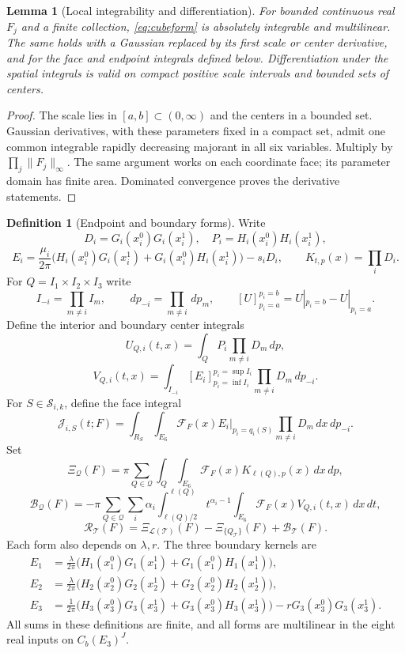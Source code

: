 \documentclass[12pt,reqno]{amsart}
\theoremstyle{plain}
\newtheorem{lemma}[theorem]{Lemma}
\theoremstyle{definition}
\newtheorem{definition}[theorem]{Definition}
\theoremstyle{remark}
\numberwithin{equation}{section}
\newcommand{\T}{\mathcal T}
\newcommand{\dd}{\,d}
\begin{document}
\begin{lemma}[Local integrability and differentiation]\label{lem:local_integrability}
For bounded continuous real $F_j$ and a finite collection,
\eqref{eq:cubeform} is absolutely integrable and multilinear.
The same holds with a Gaussian replaced by its first scale or center
derivative, and for the face and endpoint integrals defined below.
Differentiation under the spatial integrals is valid on compact
positive scale intervals and bounded sets of centers.
\end{lemma}
\begin{proof}
The scale lies in $[a,b]\subset(0,\infty)$ and the centers in a
bounded set. Gaussian derivatives, with these parameters fixed in a
compact set, admit one common integrable rapidly decreasing majorant
in all six variables. Multiply by $\prod_j\|F_j\|_\infty$.
The same argument works on each coordinate face; its parameter domain
has finite area. Dominated convergence proves the derivative statements.
\end{proof}

\begin{definition}[Endpoint and boundary forms]\label{def:boundary}
Write
\[
 D_i=G_i(x_i^0)G_i(x_i^1),\quad P_i=H_i(x_i^0)H_i(x_i^1),
\]
\[
 E_i=\frac{\mu_i}{2\pi}
       \big(H_i(x_i^0)G_i(x_i^1)+G_i(x_i^0)H_i(x_i^1)\big)-s_iD_i,
 \qquad K_{t,p}(x)=\prod_iD_i.
\]
For $Q=I_1\times I_2\times I_3$ write
\[
 I_{-i}=\prod_{m\ne i}I_m,\qquad
 \dd p_{-i}=\prod_{m\ne i}\dd p_m,\qquad
 [U]_{p_i=a}^{p_i=b}=U|_{p_i=b}-U|_{p_i=a}.
\]
Define the interior and boundary center integrals
\[
 U_{Q,i}(t,x)=\int_Q P_i\prod_{m\ne i}D_m\dd p,
\]
\[
 V_{Q,i}(t,x)=\int_{I_{-i}}
       [E_i]_{p_i=\inf I_i}^{p_i=\sup I_i}\prod_{m\ne i}D_m\dd p_{-i}.
\]
For $S\in\mathscr S_{i,k}$, define the face integral
\[
 \mathcal J_{i,S}(t;F)
 =\int_{R_S}\int_{E_6}\mathcal F_F(x)
       E_i\big|_{p_i=q_i(S)}\prod_{m\ne i}D_m\dd x\dd p_{-i}.
\]
Set
\[
 \Xi_{\mathcal Q}(F)=\pi\sum_{Q\in\mathcal Q}
       \int_Q\int_{E_6}\mathcal F_F(x)K_{\ell(Q),p}(x)\dd x\dd p,
\]
\[
 \mathcal B_{\mathcal Q}(F)=-\pi\sum_{Q\in\mathcal Q}\sum_i\alpha_i
       \int_{\ell(Q)/2}^{\ell(Q)}t^{\alpha_i-1}
         \int_{E_6}\mathcal F_F(x)V_{Q,i}(t,x)\dd x\dd t,
\]
\[
 \mathcal R_\T(F)=\Xi_{\mathcal L(\T)}(F)-\Xi_{\{Q_\T\}}(F)
                         +\mathcal B_\T(F).
\]
Each form also depends on $\lambda,r$.
The three boundary kernels are
\begin{align*}
 E_1&=\frac{\lambda}{2\pi}
       \big(H_1(x_1^0)G_1(x_1^1)+G_1(x_1^0)H_1(x_1^1)\big),\\
 E_2&=\frac{\lambda}{2\pi}
       \big(H_2(x_2^0)G_2(x_2^1)+G_2(x_2^0)H_2(x_2^1)\big),\\
 E_3&=\frac{1}{2\pi}
       \big(H_3(x_3^0)G_3(x_3^1)+G_3(x_3^0)H_3(x_3^1)\big)
                    -rG_3(x_3^0)G_3(x_3^1).
\end{align*}
All sums in these definitions are finite, and all forms are multilinear
in the eight real inputs on $C_b(E_3)^J$.
\end{definition}
\end{document}

